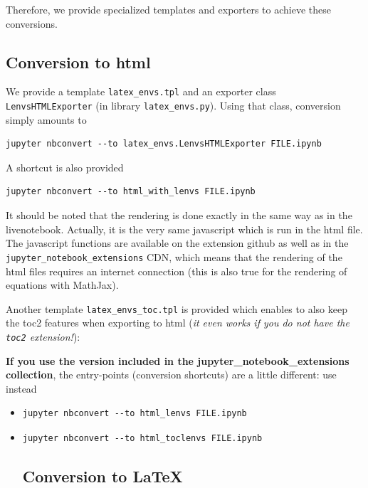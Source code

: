 Therefore, we provide specialized templates and exporters to achieve
these conversions.

    \subsection{Conversion to html}\label{conversion-to-html}

We provide a template \texttt{latex\_envs.tpl} and an exporter class
\texttt{LenvsHTMLExporter} (in library \texttt{latex\_envs.py}). Using
that class, conversion simply amounts to

\begin{verbatim}
jupyter nbconvert --to latex_envs.LenvsHTMLExporter FILE.ipynb
\end{verbatim}

A shortcut is also provided

\begin{verbatim}
jupyter nbconvert --to html_with_lenvs FILE.ipynb
\end{verbatim}

It should be noted that the rendering is done exactly in the same way as
in the livenotebook. Actually, it is the very same javascript which is
run in the html file. The javascript functions are available on the
extension github as well as in the
\texttt{jupyter\_notebook\_extensions} CDN, which means that the
rendering of the html files requires an internet connection (this is
also true for the rendering of equations with MathJax).

Another template \texttt{latex\_envs\_toc.tpl} is provided which enables
to also keep the toc2 features when exporting to html (\emph{it even
works if you do not have the \texttt{toc2} extension!}):

\begin{Shaded}
\begin{Highlighting}[]
 
\end{Highlighting}
\end{Shaded}

\textbf{If you use the version included in the
jupyter\_notebook\_extensions collection}, the entry-points (conversion
shortcuts) are a little different: use instead

\begin{itemize}
\item
\begin{verbatim}
jupyter nbconvert --to html_lenvs FILE.ipynb
\end{verbatim}
\item
\begin{verbatim}
jupyter nbconvert --to html_toclenvs FILE.ipynb
\end{verbatim}

  \subsection{Conversion to LaTeX}\label{conversion-to-latex}
\end{itemize}

